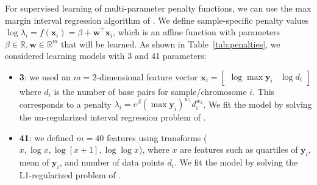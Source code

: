 \documentclass{article}
\newcommand{\RR}{\mathbb R}
\begin{document}
For supervised learning of multi-parameter penalty functions, we can
use the max margin interval regression algorithm of
\citet{HOCKING-penalties}.  We define sample-specific penalty values
$\log \lambda_i = f(\mathbf x_i)= \beta + \mathbf w^\intercal \mathbf
x_i$, which is an affine function with parameters $\beta\in\RR,\mathbf
w\in\RR^m$ that will be learned. As shown in
Table~\ref{tab:penalties}, we considered learning models with 3 and 41
parameters:

\begin{itemize}
\item \textbf{3}: we used an $m=2$-dimensional feature
  vector $\mathbf x_i = \left[\begin{array}{cc} \log\max \mathbf y_i &
      \log d_i
\end{array}\right]$ where $d_i$ is the number of base pairs for 
sample/chromosome $i$.  This corresponds to a penalty $\lambda_i =
e^\beta (\max\mathbf y_i)^{w_1} d_i^{w_2}$. We fit the model by
solving the un-regularized interval regression problem of
\citet{HOCKING-penalties}.
\item \textbf{41}: we defined $m=40$ features using transforms ($x,
  \log x, \log[x+1], \log\log x$), where $x$ are features such as
  quartiles of $\mathbf y_i$, mean of $\mathbf y_i$, and
  number of data points $d_i$. We fit the model by solving
  the L1-regularized problem of
  \citet{HOCKING-penalties}.
\end{itemize}
\end{document}
